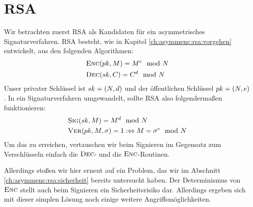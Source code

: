 \section{RSA}
Wir betrachten zuerst RSA als Kandidaten für ein asymmetrisches Signaturverfahren. RSA besteht, wie in Kapitel \ref{ch:asymmenc:rsa:vorgehen} entwickelt,
aus den folgenden Algorithmen:
\begin{align*}
& \textsc{Enc}(pk, M) = M^e \mod N\\
& \textsc{Dec}(sk, C) = C^d \mod N
\end{align*}
Unser privater Schlüssel ist $sk = (N, d)$ und der öffentlichen Schlüssel $pk = (N, e)$. In ein Signaturverfahren umgewandelt, sollte RSA
also folgendermaßen funktionieren:
\begin{align*}
& \textsc{Sig}(sk, M) = M^d \mod N\\
& \textsc{Ver}(pk, M, \sigma) = 1 : \Leftrightarrow M = \sigma^e \mod N 
\end{align*}
Um das zu erreichen, vertauschen wir beim Signieren im Gegensatz zum Verschlüsseln einfach die $\textsc{Dec}$- und die $\textsc{Enc}$-Routinen.

Allerdings stoßen wir hier erneut auf ein Problem, das wir im Abschnitt \ref{ch:asymmenc:rsa:sicherheit} bereits untersucht haben. Der Determinismus von
$\textsc{Enc}$ stellt auch beim Signieren ein Sicherheitsrisiko dar. Allerdings ergeben sich mit dieser simplen Lösung noch einige weitere Angriffsmöglichkeiten.

